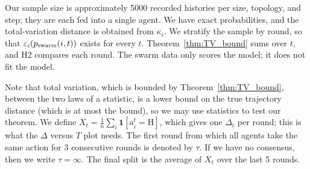 Our sample size is approximately 5000 recorded histories per size, topology, and step; they are each fed into a single agent.
We have exact probabilities, and the total-variation distance is obtained from $\kappa_i$.
We stratify the sample by round, so that $\varepsilon_i(p_{\mathrm{swarm}}(i,t))$ exists for every $t$.
Theorem~\ref{thm:TV_bound} sums over $t$, and H2 compares each round.
The swarm data only scores the model; it does not fit the model.

Note that total variation, which is bounded by Theorem~\ref{thm:TV_bound}, between the two laws of a statistic, is a lower bound on the true trajectory distance (which is at most the bound), so we may use statistics to test our theorem.
We define $X_t = \tfrac{1}{n} \sum_i \mathbf{1}[a^t_i = \mathrm{H}]$, which gives one $\Delta_t$ per round; this is what the $\Delta$ versus $T$ plot needs.
The first round from which all agents take the same action for 3 consecutive rounds is denoted by $\tau$.
If we have no consensus, then we write $\tau = \infty$.
The final split is the average of $X_t$ over the last 5 rounds.

